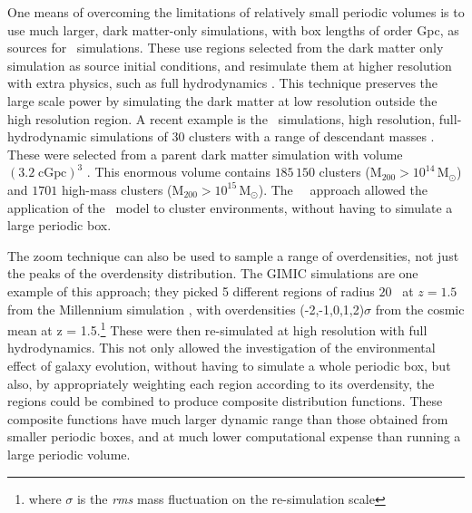 One means of overcoming the limitations of relatively small periodic volumes is to use much larger, dark matter-only simulations, with box lengths of order Gpc, as sources for \zoom\ simulations.
These use regions selected from the dark matter only simulation as source initial conditions, and resimulate them at higher resolution with extra physics, such as full hydrodynamics \citep{katz_hierarchical_1993, tormen_structure_1997}.
This technique preserves the large scale power by simulating the dark matter at low resolution outside the high resolution region.
A recent example is the \ceagle\ simulations, high resolution, full-hydrodynamic simulations of 30 clusters with a range of descendant masses \citep{barnes_cluster-eagle_2017,bahe_hydrangea_2017}.
These were selected from a parent dark matter simulation with volume $(3.2 \;\mathrm{cGpc})^{3}$ \citep{barnes_redshift_2017}.
This enormous volume contains $185\,150$ clusters ($\mathrm{M_{200}} > 10^{14} \, \mathrm{M_{\odot}}$) and $1701$ high-mass clusters ($\mathrm{M_{200}} > 10^{15} \, \mathrm{M_{\odot}}$).
The \ceagle\ \zoom\ approach allowed the application of the \eagle\ model to cluster environments, without having to simulate a large periodic box.

The zoom technique can also be used to sample a range of overdensities, not just the peaks of the overdensity distribution.
The \textsc{GIMIC} simulations \citep{crain_galaxies-intergalactic_2009} are one example of this approach;
they picked 5 different regions of radius $20$ \cMpch\, at $z = 1.5$ from the Millennium simulation \citep{springel_simulations_2005}, with overdensities (-2,-1,0,1,2)$\sigma$ from the cosmic mean at z = 1.5.\footnote{where $\sigma$ is the \textit{rms} mass fluctuation on the re-simulation scale}
These were then re-simulated at high resolution with full hydrodynamics.
This not only allowed the investigation of the environmental effect of galaxy evolution, without having to simulate a whole periodic box, but also, by appropriately weighting each region according to its overdensity, the regions could be combined to produce composite distribution functions.
These composite functions have much larger dynamic range than those obtained from smaller periodic boxes, and at much lower computational expense than running a large periodic volume.


